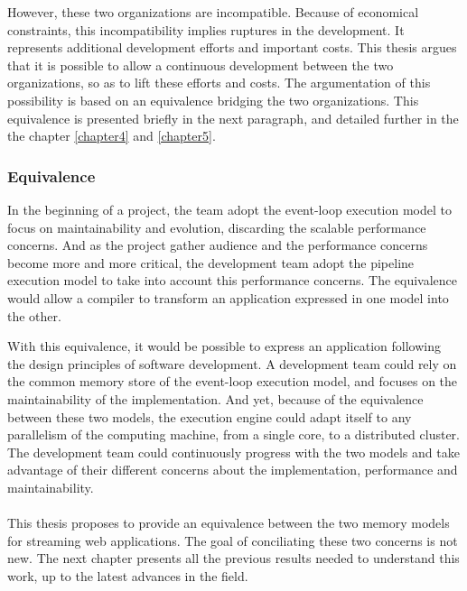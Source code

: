However, these two organizations are incompatible.
Because of economical constraints, this incompatibility implies ruptures in the development.
It represents additional development efforts and important costs.
This thesis argues that it is possible to allow a continuous development between the two organizations, so as to lift these efforts and costs.
The argumentation of this possibility is based on an equivalence bridging the two organizations.
This equivalence is presented briefly in the next paragraph, and detailed further in the the chapter \ref{chapter4} and \ref{chapter5}.

\subsubsection{Equivalence}

In the beginning of a project, the team adopt the event-loop execution model to focus on maintainability and evolution, discarding the scalable performance concerns.
And as the project gather audience and the performance concerns become more and more critical, the development team adopt the pipeline execution model to take into account this performance concerns.
The equivalence would allow a compiler to transform an application expressed in one model into the other.

With this equivalence, it would be possible to express an application following the design principles of software development.
A development team could rely on the common memory store of the event-loop execution model, and focuses on the maintainability of the implementation.
And yet, because of the equivalence between these two models, the execution engine could adapt itself to any parallelism of the computing machine, from a single core, to a distributed cluster.
The development team could continuously progress with the two models and take advantage of their different concerns about the implementation, performance and maintainability.

\paragraph{}

This thesis proposes to provide an equivalence between the two memory models for streaming web applications.
The goal of conciliating these two concerns is not new.
The next chapter presents all the previous results needed to understand this work, up to the latest advances in the field.